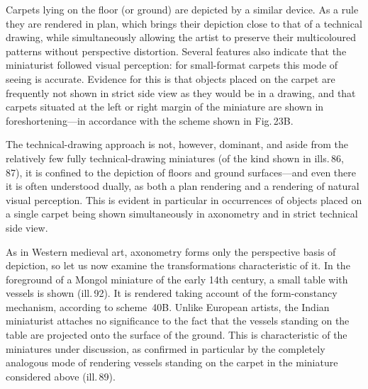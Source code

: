


Carpets lying on the floor (or ground) are depicted by a similar device. As a rule
they are rendered in plan, which brings their depiction close to that of a technical
drawing, while simultaneously allowing the artist to preserve their multicoloured
patterns without perspective distortion. Several features also indicate that the
miniaturist followed visual perception: for small-format carpets this mode of seeing
is accurate. Evidence for this is that objects placed on the carpet are frequently
not shown in strict side view as they would be in a drawing, and that carpets
situated at the left or right margin of the miniature are shown in
foreshortening---in accordance with the scheme shown in Fig.\,23B.

The technical-drawing approach is not, however, dominant, and aside from the
relatively few fully technical-drawing miniatures (of the kind shown in ills.\,86,
87), it is confined to the depiction of floors and ground surfaces---and even there
it is often understood dually, as both a plan rendering and a rendering of natural
visual perception. This is evident in particular in occurrences of objects placed on
a single carpet being shown simultaneously in axonometry and in strict technical
side view.

As in Western medieval art, axonometry forms only the perspective basis of
depiction, so let us now examine the transformations characteristic of it. In the
foreground of a Mongol miniature of the early 14th century, a small table with
vessels is shown (ill.\,92). It is rendered taking account of the form-constancy
mechanism, according to scheme~40B. Unlike European artists, the Indian miniaturist
attaches no significance to the fact that the vessels standing on the table are
projected onto the surface of the ground. This is characteristic of the miniatures
under discussion, as confirmed in particular by the completely analogous mode of
rendering vessels standing on the carpet in the miniature considered above (ill.\,89).



